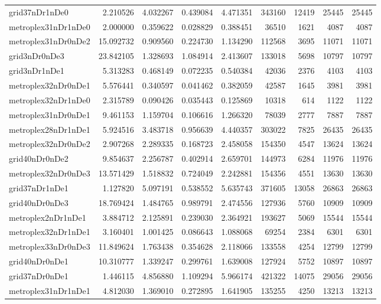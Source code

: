 \begin{longtable}{|l|r|r|r|r|r|r|r|r|}
grid37nDr1nDe0 & 2.210526 & 4.032267 & 0.439084 & 4.471351 & 343160 & 12419 & 25445 & 25445 \\
metroplex31nDr1nDe0 & 2.000000 & 0.359622 & 0.028829 & 0.388451 & 36510 & 1621 & 4087 & 4087 \\
metroplex31nDr0nDe2 & 15.092732 & 0.909560 & 0.224730 & 1.134290 & 112568 & 3695 & 11071 & 11071 \\
grid3nDr0nDe3 & 23.842105 & 1.328693 & 1.084914 & 2.413607 & 133018 & 5698 & 10797 & 10797 \\
grid3nDr1nDe1 & 5.313283 & 0.468149 & 0.072235 & 0.540384 & 42036 & 2376 & 4103 & 4103 \\
metroplex32nDr0nDe1 & 5.576441 & 0.340597 & 0.041462 & 0.382059 & 42587 & 1645 & 3981 & 3981 \\
metroplex32nDr1nDe0 & 2.315789 & 0.090426 & 0.035443 & 0.125869 & 10318 & 614 & 1122 & 1122 \\
metroplex31nDr0nDe1 & 9.461153 & 1.159704 & 0.106616 & 1.266320 & 78039 & 2777 & 7887 & 7887 \\
metroplex28nDr1nDe1 & 5.924516 & 3.483718 & 0.956639 & 4.440357 & 303022 & 7825 & 26435 & 26435 \\
metroplex32nDr0nDe2 & 2.907268 & 2.289335 & 0.168723 & 2.458058 & 154350 & 4547 & 13624 & 13624 \\
grid40nDr0nDe2 & 9.854637 & 2.256787 & 0.402914 & 2.659701 & 144973 & 6284 & 11976 & 11976 \\
metroplex32nDr0nDe3 & 13.571429 & 1.518832 & 0.724049 & 2.242881 & 154356 & 4551 & 13630 & 13630 \\
grid37nDr1nDe1 & 1.127820 & 5.097191 & 0.538552 & 5.635743 & 371605 & 13058 & 26863 & 26863 \\
grid40nDr0nDe3 & 18.769424 & 1.484765 & 0.989791 & 2.474556 & 127936 & 5760 & 10909 & 10909 \\
metroplex2nDr1nDe1 & 3.884712 & 2.125891 & 0.239030 & 2.364921 & 193627 & 5069 & 15544 & 15544 \\
metroplex32nDr1nDe1 & 3.160401 & 1.001425 & 0.086643 & 1.088068 & 69254 & 2384 & 6301 & 6301 \\
metroplex33nDr0nDe3 & 11.849624 & 1.763438 & 0.354628 & 2.118066 & 133558 & 4254 & 12799 & 12799 \\
grid40nDr0nDe1 & 10.310777 & 1.339247 & 0.299761 & 1.639008 & 127924 & 5752 & 10897 & 10897 \\
grid37nDr0nDe1 & 1.446115 & 4.856880 & 1.109294 & 5.966174 & 421322 & 14075 & 29056 & 29056 \\
metroplex31nDr1nDe1 & 4.812030 & 1.369010 & 0.272895 & 1.641905 & 135255 & 4250 & 13213 & 13213 \\

\end{longtable}
